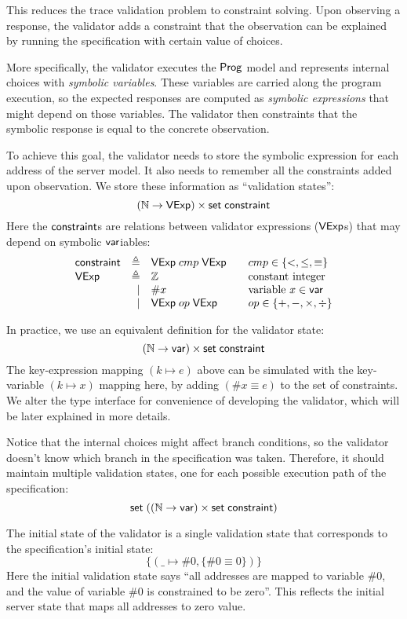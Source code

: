 This reduces the trace validation problem to constraint solving.  Upon observing
a response, the validator adds a constraint that the observation can be
explained by running the specification with certain value of choices.

More specifically, the validator executes the $\mathsf{Prog}$ model and represents
internal choices with {\em symbolic variables}.  These variables are carried
along the program execution, so the expected responses are computed as {\em
  symbolic expressions} that might depend on those variables.  The validator
then constraints that the symbolic response is equal to the concrete
observation.

To achieve this goal, the validator needs to store the symbolic expression for
each address of the server model.  It also needs to remember all the constraints
added upon observation.  We store these information as ``validation states'':
\[(\mathbb N\to\mathsf{VExp})\times\mathsf{set}\;\mathsf{constraint}\]
Here the $\mathsf{constraint}$s are relations between validator expressions ($\mathsf{VExp}$s)
that may depend on symbolic $\mathsf{var}$iables:
\[\begin{array}{lrl@{\qquad}l}
\constraint&\triangleq&\Vexp\;cmp\;\Vexp&cmp\in\{<,\le,\equiv\}\\
\Vexp&\triangleq&\Int&\text{constant integer}\\
&\mid&\#x&\text{variable }x\in\Var\\
&\mid&\Vexp\;op\;\Vexp&op\in\{+,-,\times,\div\}\\
\end{array}\]

In practice, we use an equivalent definition for the validator state:
\[(\mathbb N\to\mathsf{var})\times\mathsf{set}\;\mathsf{constraint}\]
The key-expression mapping $(k\mapsto e)$ above can be simulated with the
key-variable $(k\mapsto x)$ mapping here, by adding $(\#x\equiv e)$ to the set
of constraints.  We alter the type interface for convenience of developing the
validator, which will be later explained in more details.

Notice that the internal choices might affect branch conditions, so the
validator doesn't know which branch in the specification was taken.  Therefore,
it should maintain multiple validation states, one for each possible execution
path of the specification:
\[\mathsf{set}\;((\mathbb N\to\mathsf{var})\times\mathsf{set}\;\mathsf{constraint})\]

The initial state of the validator is a single validation state that corresponds
to the specification's initial state:
\[\{(\_\mapsto\#0,\{\#0\equiv0\})\}\]
Here the initial validation state says ``all addresses are mapped to variable
$\#0$, and the value of variable $\#0$ is constrained to be zero''.  This
reflects the initial server state that maps all addresses to zero value.

